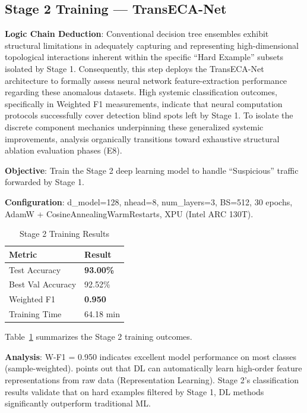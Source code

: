 \documentclass[sigconf]{acmart}
\begin{document}
\subsection{Stage 2 Training --- TransECA-Net}
\textbf{Logic Chain Deduction}: Conventional decision tree ensembles exhibit structural limitations in adequately capturing and representing high-dimensional topological interactions inherent within the specific ``Hard Example'' subsets isolated by Stage 1. Consequently, this step deploys the TransECA-Net architecture to formally assess neural network feature-extraction performance regarding these anomalous datasets. High systemic classification outcomes, specifically in Weighted F1 measurements, indicate that neural computation protocols successfully cover detection blind spots left by Stage 1. To isolate the discrete component mechanics underpinning these generalized systemic improvements, analysis organically transitions toward exhaustive structural ablation evaluation phases (E8).

\textbf{Objective}: Train the Stage 2 deep learning model to handle ``Suspicious'' traffic forwarded by Stage 1.

\textbf{Configuration}: d\_model=128, nhead=8, num\_layers=3, BS=512, 30 epochs, AdamW + CosineAnnealingWarmRestarts, XPU (Intel ARC 130T).

\begin{table}[!h]
\caption{Stage 2 Training Results}
\label{tab:s2_results}
\begin{tabular}{ll}
\toprule
\textbf{Metric} & \textbf{Result} \\
\midrule
Test Accuracy & \textbf{93.00\%} \\
Best Val Accuracy & 92.52\% \\
Weighted F1 & \textbf{0.950} \\
Training Time & 64.18 min \\
\bottomrule
\end{tabular}
\end{table}

\noindent Table~\ref{tab:s2_results} summarizes the Stage 2 training outcomes.

\textbf{Analysis}: W-F1 = 0.950 indicates excellent model performance on most classes (sample-weighted). \cite{5} points out that DL can automatically learn high-order feature representations from raw data (Representation Learning). Stage 2's classification results validate that on hard examples filtered by Stage 1, DL methods significantly outperform traditional ML.
\end{document}
